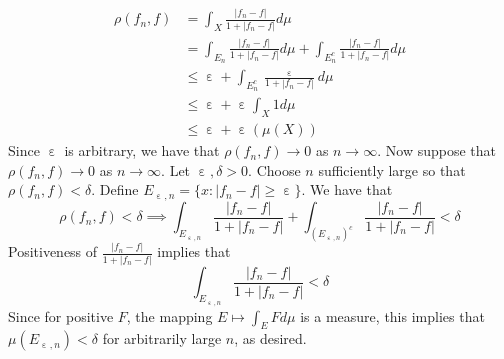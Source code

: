 \documentclass[letterpaper]{article}
\DeclareMathOperator{\ep}{\varepsilon}
\begin{document}
\begin{align*} \rho(f_n,f) &= \int_{X} \frac{|f_n-f|}{1+|f_n-f|} d\mu 
    \\ & = \int_{E_{n}} \frac{|f_n-f|}{1+|f_n-f|} d\mu + \int_{E_n^c} \frac{|f_n-f|}{1+|f_n-f|} d\mu
    \\ & \leq \ep + \int_{E_n^c} \frac{\ep}{1+|f_n-f|} d\mu
    \\ & \leq \ep + \ep \int_{X} 1 d \mu 
    \\ & \leq \ep + \ep(\mu(X))
\end{align*}
Since $\ep$ is arbitrary, we have that $\rho(f_n,f) \to 0$ as $n\to \infty$. Now suppose that $\rho(f_n,f)\to 0$ as $n\to \infty$. Let $\ep ,\delta >0$. Choose $n$ sufficiently large so that $\rho(f_n,f) <\delta$.  Define $E_{\ep, n} = \{x: |f_n-f| \geq \ep \}$. We have that
$$\rho(f_n,f)<\delta \implies \int_{E_{\ep,n}} \frac{|f_n-f|}{1+|f_n-f|} + \int_{(E_{\ep,n})^c} \frac{|f_n-f|}{1+|f_n-f|} <\delta$$
Positiveness of $\frac{|f_n-f|}{1+|f_n-f|}$ implies that $$\int_{E_{\ep,n}} \frac{|f_n-f|}{1+|f_n-f|}<\delta$$ Since for positive $F$, the mapping $E\mapsto \int_E F d\mu$ is a measure, this implies that $\mu(E_{\ep,n}) <\delta$ for arbitrarily large $n$, as desired. 
\end{document}
